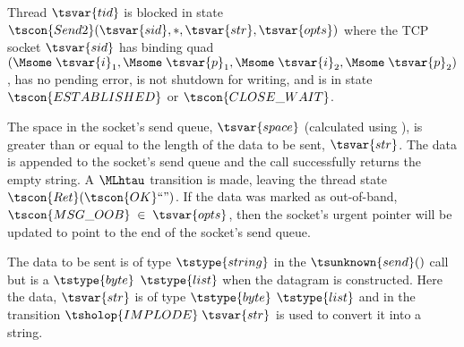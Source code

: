 {{    Thread $\tsvar{tid}$ is blocked in state $\tscon{Send2}(\tsvar{sid},*,\tsvar{str},\tsvar{opts})$ where the TCP socket $\tsvar{sid}$ has
    binding quad $(\Msome  \;\tsvar{i}_{1},\Msome  \;\tsvar{p}_{1},\Msome  \;\tsvar{i}_{2},\Msome  \;\tsvar{p}_{2})$, has no pending error, is not shutdown for
    writing, and is in state $\tscon{ESTABLISHED}$ or $\tscon{CLOSE\_WAIT}$.

    The space in the socket's send queue, $\tsvar{space}$ (calculated using ),
    is greater than or equal to the length of the data to be sent, $\tsvar{str}$. The data is appended to
    the socket's send queue and the call successfully returns the empty string. A $\MLhtau $
    transition is made, leaving the thread state $\tscon{Ret} (\tscon{OK} \text{``''})$. If the data was marked as
    out-of-band, $\tscon{MSG\_OOB} \;\in  \;\tsvar{opts}$, then the socket's urgent pointer will be updated to point to
    the end of the socket's send queue.


    The data to be sent is of type $\tstype{string}$ in the $\tsunknown{send}()$ call but is a $\tstype{byte}$ $\tstype{list}$ when
    the datagram is constructed. Here the data, $\tsvar{str}$ is of type $\tstype{byte}$ $\tstype{list}$ and in the
    transition $\tsholop{IMPLODE} \;\tsvar{str}$ is used to convert it into a string.


\rrulepad }
}
